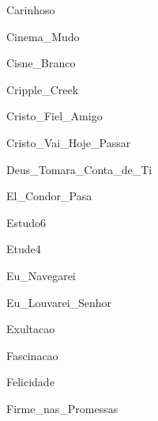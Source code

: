 \documentclass{scrartcl}
\begin{document}

{Carinhoso}



{Cinema_Mudo}



{Cisne_Branco}



{Cripple_Creek}



{Cristo_Fiel_Amigo}



{Cristo_Vai_Hoje_Passar}



{Deus_Tomara_Conta_de_Ti}



{El_Condor_Pasa}


{Estudo6}



{Etude4}



{Eu_Navegarei}



{Eu_Louvarei_Senhor}



{Exultacao}



{Fascinacao}


{Felicidade}


{Firme_nas_Promessas}
\end{document}
